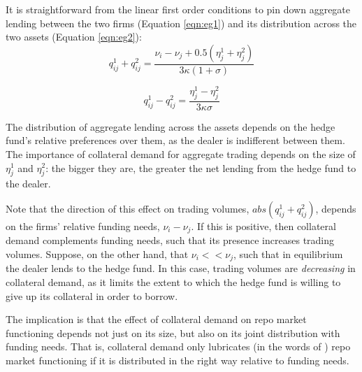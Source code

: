 It is straightforward from the linear first order conditions to pin down aggregate lending between the two firms (Equation \ref{eqn:eg1}) and its distribution across the two assets (Equation \ref{eqn:eg2}):
\begin{equation}\label{eqn:eg1}
    q^1_{ij}+q^2_{ij}=\frac{\nu_{i}-\nu_{j}+0.5(\eta^1_j+\eta^2_j)}{3\kappa(1+\sigma)}
\end{equation}

\begin{equation}\label{eqn:eg2}
    q^1_{ij}-q^2_{ij}=\frac{\eta_j^1-\eta_j^2}{3\kappa\sigma}
\end{equation}

The distribution of aggregate lending across the assets depends on the hedge fund's relative preferences over them, as the dealer is indifferent between them. The importance of collateral demand for aggregate trading depends on the size of $\eta^1_{j}$ and $\eta^2_{j}$: the bigger they are, the greater the net lending from the hedge fund to the dealer. 

Note that the direction of this effect on trading volumes, $abs(q^1_{ij}+q^2_{ij})$, depends on the firms' relative funding needs, $\nu_i-\nu_j$. If this is positive, then collateral demand complements funding needs, such that its presence increases trading volumes. Suppose, on the other hand, that $\nu_i<<\nu_j$, such that in equilibrium the dealer lends to the hedge fund. In this case, trading volumes are \textit{decreasing} in collateral demand, as it limits the extent to which the hedge fund is willing to give up its collateral in order to borrow.

The implication is that the effect of collateral demand on repo market functioning depends not just on its size, but also on its joint distribution with funding needs. That is, collateral demand only lubricates (in the words of \cite{singh2011velocity}) repo market functioning if it is distributed in the right way relative to funding needs.




